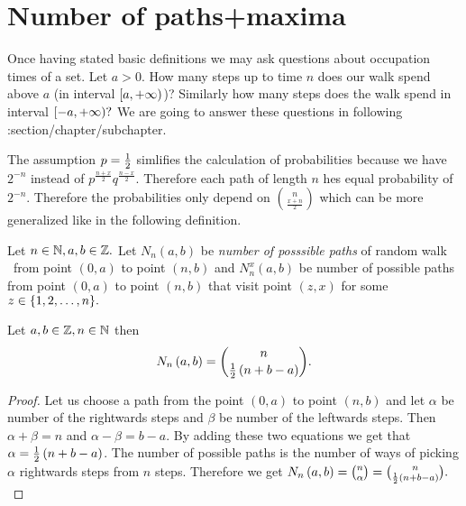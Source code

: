 \chapter{Number of paths+maxima}
\begin{rem}
  Once having stated basic definitions we may ask questions about occupation times of a set.
  Let $a>0$. How many steps up to time $n$ does our walk spend above $a$ (in interval $[a,{+\infty})$)?
  Similarly how many steps does the walk spend in interval $[-a,{+\infty})?$
  We are going to answer these questions in following \todo:section/chapter/subchapter.
\end{rem}

\begin{rem}
  The assumption $p=\frac{1}{2}$ simlifies the calculation of probabilities because we have $2^{-n}$ instead of $p^{\frac{n+x}{2}}q^{\frac{n-x}{2}}.$ Therefore each path of length $n$ hes equal probability of $2^{-n}.$
  Therefore the probabilities only depend on $\binom{n}{\frac{x+n}{2}}$ which can be more generalized like in the following definition.
\end{rem}

\begin{defn}\label{defn-number_possible_paths}
 Let $n \in \mathbb{N}, a,b \in \mathbb{Z}.$ Let $N_n \left( a,b \right)$ be \emph{number of posssible paths} of random walk \rw\ from point $ \left( 0,a \right) $ to point $ \left( n,b \right)$
 and $N_n^x \left( a,b \right) $ be number of possible paths from point $ \left( 0,a \right) $ to point $\left( n,b \right)$
 that visit point $\left(z,x\right)$ for some $z \in \{1,2,\ldots, n\}.$
\end{defn}
\begin{thm}\label{thm-number_of_possible_paths}
 Let $a,b \in \mathbb{Z}, n \in \mathbb{N}$ then
 \[
    N_n \left( a,b \right) =\binom{n}{\frac{1}{2} \left(n+b-a \right)}.
  \]
\end{thm}
\begin{proof}
 Let us choose a path from the point $ \left( 0,a \right) $ to point $ \left( n,b \right) $ and let $\alpha$ be number of the rightwards steps and $\beta$ be number of the leftwards steps.
 Then $\alpha+\beta=n$ and $\alpha-\beta=b-a$. By adding these two equations we get that $\alpha=\frac{1}{2} \left( n+b-a \right) $.
 The number of possible paths is the number of ways of picking $\alpha$ rightwards steps from $n$ steps.
 Therefore we get $N_n \left( a,b \right) =\binom{n}{\alpha}=\binom{n}{\frac{1}{2} \left( n+b-a \right) }.$
\end{proof}

